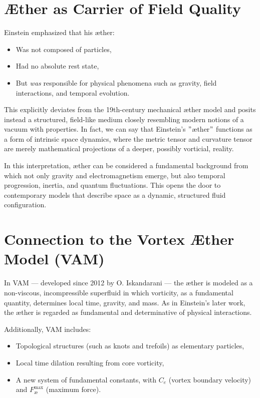 \section{Æther as Carrier of Field Quality}

    Einstein emphasized that his æther:
    \begin{itemize}
        \item Was not composed of particles,
        \item Had no absolute rest state,
        \item But \emph{was} responsible for physical phenomena such as gravity, field interactions, and temporal evolution.
    \end{itemize}

    This explicitly deviates from the 19th-century mechanical æther model and posits instead a structured, field-like medium closely resembling modern notions of a vacuum with properties. In fact, we can say that Einstein's \("\)æther\("\) functions as a form of intrinsic space dynamics, where the metric tensor and curvature tensor are merely mathematical projections of a deeper, possibly vorticial, reality.

    In this interpretation, æther can be considered a fundamental background from which not only gravity and electromagnetism emerge, but also temporal progression, inertia, and quantum fluctuations. This opens the door to contemporary models that describe space as a dynamic, structured fluid configuration.

    \section{Connection to the Vortex Æther Model (VAM)}

    In VAM — developed since 2012 by O. Iskandarani — the æther is modeled as a non-viscous, incompressible superfluid in which vorticity, as a fundamental quantity, determines local time, gravity, and mass. As in Einstein's later work, the æther is regarded as fundamental and determinative of physical interactions.

    Additionally, VAM includes:
    \begin{itemize}
        \item Topological structures (such as knots and trefoils) as elementary particles,
        \item Local time dilation resulting from core vorticity,
        \item A new system of fundamental constants, with $C_e$ (vortex boundary velocity) and $F^{\text{max}}_{\text{\ae}}$ (maximum force).
    \end{itemize}

